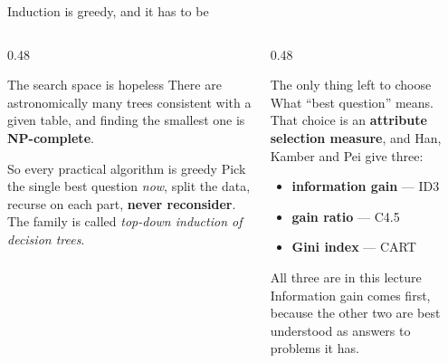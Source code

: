 \documentclass[aspectratio=169]{beamer}
\begin{document}
\begin{frame}[shrink=5]{Induction is greedy, and it has to be}
  \begin{columns}[T]
    \begin{column}{0.48\textwidth}
      \begin{block}{The search space is hopeless}
        There are astronomically many trees consistent with a given table, and
        finding the smallest one is \textbf{NP-complete}.
      \end{block}
      \begin{block}{So every practical algorithm is greedy}
        Pick the single best question \emph{now}, split the data, recurse on
        each part, \textbf{never reconsider}. The family is called
        \emph{top-down induction of decision trees}.
      \end{block}
    \end{column}
    \begin{column}{0.48\textwidth}
      \begin{exampleblock}{The only thing left to choose}
        What ``best question'' means. That choice is an \textbf{attribute
        selection measure}, and Han, Kamber and Pei give three:
        \begin{itemize}\small
          \item \textbf{information gain} --- ID3
          \item \textbf{gain ratio} --- C4.5
          \item \textbf{Gini index} --- CART
        \end{itemize}
      \end{exampleblock}
      \begin{alertblock}{All three are in this lecture}
        \small Information gain comes first, because the other two are best
        understood as answers to problems it has.
      \end{alertblock}
    \end{column}
  \end{columns}
\end{frame}
\end{document}
